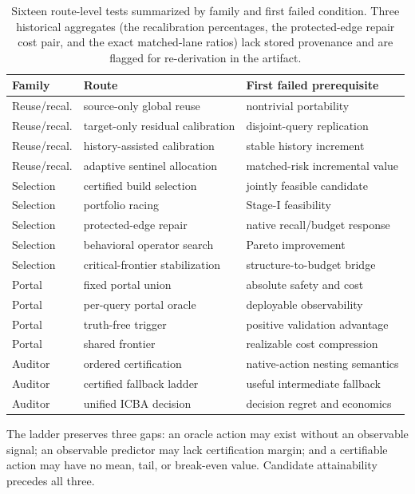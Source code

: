 \documentclass{article}
\begin{document}
\begin{table}[h]
\centering
\caption{Sixteen route-level tests summarized by family and first failed condition. Three historical
aggregates (the recalibration percentages, the protected-edge repair cost pair, and the exact matched-lane
ratios) lack stored provenance and are flagged for re-derivation in the artifact.}
\small
\begin{tabular}{lll}
\toprule
Family & Route & First failed prerequisite \\
\midrule
Reuse/recal. & source-only global reuse & nontrivial portability \\
Reuse/recal. & target-only residual calibration & disjoint-query replication \\
Reuse/recal. & history-assisted calibration & stable history increment \\
Reuse/recal. & adaptive sentinel allocation & matched-risk incremental value \\
Selection & certified build selection & jointly feasible candidate \\
Selection & portfolio racing & Stage-I feasibility \\
Selection & protected-edge repair & native recall/budget response \\
Selection & behavioral operator search & Pareto improvement \\
Selection & critical-frontier stabilization & structure-to-budget bridge \\
Portal & fixed portal union & absolute safety and cost \\
Portal & per-query portal oracle & deployable observability \\
Portal & truth-free trigger & positive validation advantage \\
Portal & shared frontier & realizable cost compression \\
Auditor & ordered certification & native-action nesting semantics \\
Auditor & certified fallback ladder & useful intermediate fallback \\
Auditor & unified ICBA decision & decision regret and economics \\
\bottomrule
\end{tabular}
\end{table}

The ladder preserves three gaps: an oracle action may exist without an observable signal; an observable
predictor may lack certification margin; and a certifiable action may have no mean, tail, or break-even
value. Candidate attainability precedes all three.
\end{document}
